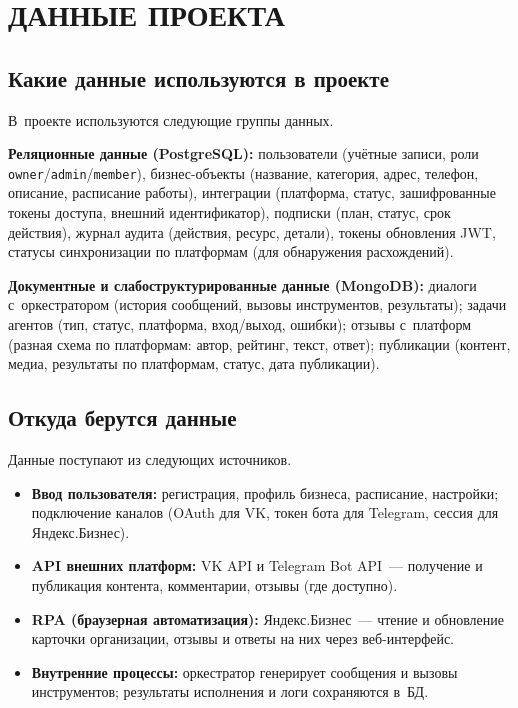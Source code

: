\chapter{{\fontsize{14pt}{21pt}\selectfont\MakeUppercase{Данные проекта}}}
\label{ch:data}

\section{Какие данные используются в проекте}

В~проекте используются следующие группы данных.

\textbf{Реляционные данные (PostgreSQL):} пользователи (учётные записи, роли \texttt{owner}/\texttt{admin}/\texttt{member}), бизнес-объекты (название, категория, адрес, телефон, описание, расписание работы), интеграции (платформа, статус, зашифрованные токены доступа, внешний идентификатор), подписки (план, статус, срок действия), журнал аудита (действия, ресурс, детали), токены обновления JWT, статусы синхронизации по платформам (для обнаружения расхождений).

\textbf{Документные и слабоструктурированные данные (MongoDB):} диалоги с~оркестратором (история сообщений, вызовы инструментов, результаты); задачи агентов (тип, статус, платформа, вход/выход, ошибки); отзывы с~платформ (разная схема по платформам: автор, рейтинг, текст, ответ); публикации (контент, медиа, результаты по платформам, статус, дата публикации).

\section{Откуда берутся данные}

Данные поступают из следующих источников.

\begin{itemize}
  \item \textbf{Ввод пользователя:} регистрация, профиль бизнеса, расписание, настройки; подключение каналов (OAuth для VK, токен бота для Telegram, сессия для Яндекс.Бизнес).
  \item \textbf{API внешних платформ:} VK API и Telegram Bot API~--- получение и публикация контента, комментарии, отзывы (где доступно).
  \item \textbf{RPA (браузерная автоматизация):} Яндекс.Бизнес~--- чтение и обновление карточки организации, отзывы и ответы на них через веб-интерфейс.
  \item \textbf{Внутренние процессы:} оркестратор генерирует сообщения и вызовы инструментов; результаты исполнения и логи сохраняются в~БД.
\end{itemize}

